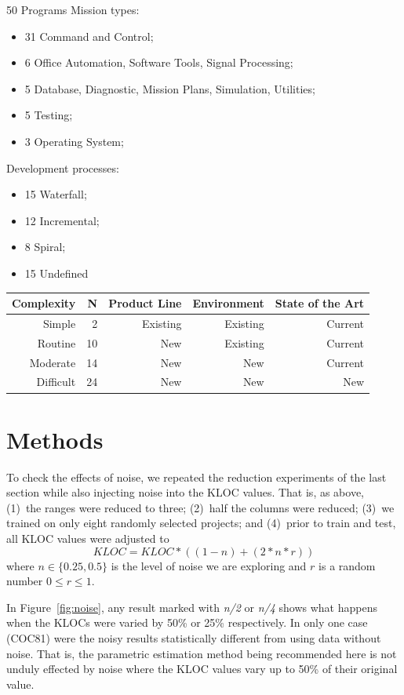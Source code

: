 \documentclass[final,twocolumn,5p]{elsarticle}
\newcommand{\bi}{\begin{itemize}[leftmargin=0.4cm]}
\newcommand{\ei}{\end{itemize}}
\newcommand{\fig}[1]{Figure~\ref{fig:#1}}
\begin{document}
    50 Programs
    Mission types:
    \bi
  \item 31 Command and Control;
    \item 6 Office Automation, Software Tools, Signal Processing;
    \item 5 Database, Diagnostic, Mission Plans, Simulation, Utilities;
    \item 5 Testing;
    \item 3 Operating System;
      \ei
      
      Development processes:
      \bi
    \item 15 Waterfall;
    \item 12 Incremental;
    \item 8 Spiral;
    \item 15 Undefined
      \ei

      {\scriptsize
      \begin{tabular}{r|r|r|r|r}
      Complexity & N &  Product Line  & Environment & State of the Art\\\hline
Simple& 2& Existing& Existing &Current\\
Routine& 10& New& Existing& Current\\
Moderate& 14& New& New& Current\\
Difficult& 24& New& New& New\\
\end{tabular}}

        
 \section{Methods}
 To check the effects of noise, we repeated the reduction
experiments of the last section while also injecting
noise into the KLOC values.
That is, as above, 
(1)~the ranges were reduced to three;
(2)~half the columns were reduced;
(3)~we trained on only eight randomly selected projects; and 
(4)~prior to train and test, all KLOC values were adjusted
to
\[\mathit{KLOC} = \mathit{KLOC}*((1- n) + (2*n*r))\]
where $n \in \{0.25,0.5\}$ is the level of noise we are exploring and $r$ is a random number
$0 \le r \le 1$.

In \fig{noise}, any result
marked with {\em n/2} or {\em n/4} shows what happens
when the KLOCs were varied by 50\% or 25\% respectively.
In only one case (COC81) were the noisy results statistically
different from using data without noise. That is,
the parametric estimation method being recommended here is
not unduly effected by noise where the KLOC values
vary up to 50\% of their original value.
\end{document}
